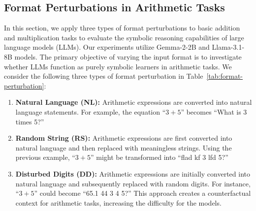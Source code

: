 \documentclass[11pt]{article}
\begin{document}
\begin{table}[t]
\vspace{-0.5cm}
\vspace{-0.2cm}
\centering
\small
{}
\caption{Test Accuracy difference $\Delta$ on perturbed addition and multiplication.}
\label{tab:data-format-results}
\end{table}
\subsection{Format Perturbations in Arithmetic Tasks}
\label{appendix:datA_format}
In this section, we apply three types of format perturbations to basic addition and multiplication tasks to evaluate the symbolic reasoning capabilities of large language models (LLMs). Our experiments utilize Gemma-2-2B and Llama-3.1-8B models. The primary objective of varying the input format is to investigate whether LLMs function as purely symbolic learners in arithmetic tasks. We consider the following three types of format perturbation in Table~\ref{tab:format-perturbation}:

\begin{enumerate}
    \item \textbf{Natural Language (NL):} Arithmetic expressions are converted into natural language statements. For example, the equation ``$3 + 5$'' becomes ``What is 3 times 5?''
    
    \item \textbf{Random String (RS):} Arithmetic expressions are first converted into natural language and then replaced with meaningless strings. Using the previous example, ``$3 + 5$'' might be transformed into ``flad kf 3 lfd 5?''
    
    \item \textbf{Disturbed Digits (DD):} Arithmetic expressions are initially converted into natural language and subsequently replaced with random digits. For instance, ``$3 + 5$'' could become ``65.1 44 3 4 5?'' This approach creates a counterfactual context for arithmetic tasks, increasing the difficulty for the models.
\end{enumerate}
\end{document}
